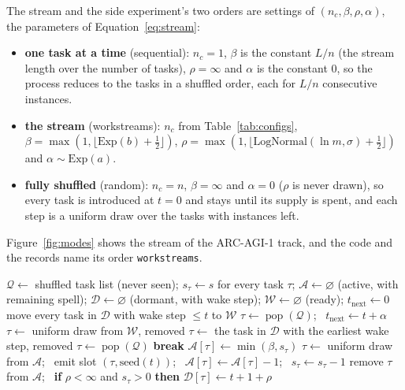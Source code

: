 The stream and the side experiment's two orders are settings of $(n_c, \beta, \rho, \alpha)$, the parameters of Equation~\ref{eq:stream}:
\begin{itemize}
  \item \textbf{one task at a time} (sequential): $n_c = 1$, $\beta$ is the constant $L / n$ (the stream length over the number of tasks), $\rho = \infty$ and $\alpha$ is the constant 0, so the process reduces to the tasks in a shuffled order, each for $L/n$ consecutive instances.
  \item \textbf{the stream} (workstreams): $n_c$ from Table~\ref{tab:configs}, $\beta = \max(1, \lfloor \mathrm{Exp}(b) + \tfrac12 \rfloor)$, $\rho = \max(1, \lfloor \mathrm{LogNormal}(\ln m, \sigma) + \tfrac12 \rfloor)$ and $\alpha \sim \mathrm{Exp}(a)$.
  \item \textbf{fully shuffled} (random): $n_c = n$, $\beta = \infty$ and $\alpha = 0$ ($\rho$ is never drawn), so every task is introduced at $t = 0$ and stays until its supply is spent, and each step is a uniform draw over the tasks with instances left.
\end{itemize}
Figure~\ref{fig:modes} shows the stream of the ARC-AGI-1 track, and the code and the records name its order \texttt{workstreams}.

\begin{algorithm}[h]
\caption{The stream. Parameters: concurrency $n_c$; spell $\beta$, rest $\rho$ (possibly $\infty$) and inter-arrival time $\alpha$, each a fresh draw at every use; supply $s$ per task; length $L$.}
\label{alg:stream}
\begin{algorithmic}[1]
\STATE $\mathcal{Q} \gets$ shuffled task list (never seen); $s_\tau \gets s$ for every task $\tau$; $\mathcal{A} \gets \varnothing$ (active, with remaining spell); $\mathcal{D} \gets \varnothing$ (dormant, with wake step); $\mathcal{W} \gets \varnothing$ (ready); $t_{\mathrm{next}} \gets 0$
  \STATE move every task in $\mathcal{D}$ with wake step $\le t$ to $\mathcal{W}$
     \STATE $\tau \gets \operatorname{pop}(\mathcal{Q})$; \ $t_{\mathrm{next}} \gets t + \alpha$
     \STATE $\tau \gets$ uniform draw from $\mathcal{W}$, removed
     \STATE $\tau \gets$ the task in $\mathcal{D}$ with the earliest wake step, removed
     \STATE $\tau \gets \operatorname{pop}(\mathcal{Q})$
    \ELSE \STATE \textbf{break}
    \ENDIF
    \STATE $\mathcal{A}[\tau] \gets \min(\beta, s_\tau)$
  \ENDWHILE
  \STATE $\tau \gets$ uniform draw from $\mathcal{A}$; \ emit slot $(\tau, \text{seed}(t))$; \ $\mathcal{A}[\tau] \gets \mathcal{A}[\tau] - 1$; \ $s_\tau \gets s_\tau - 1$
   \STATE remove $\tau$ from $\mathcal{A}$; \ \textbf{if} $\rho < \infty$ and $s_\tau > 0$ \textbf{then} $\mathcal{D}[\tau] \gets t + 1 + \rho$
  \ENDIF
\ENDFOR
\end{algorithmic}
\end{algorithm}

